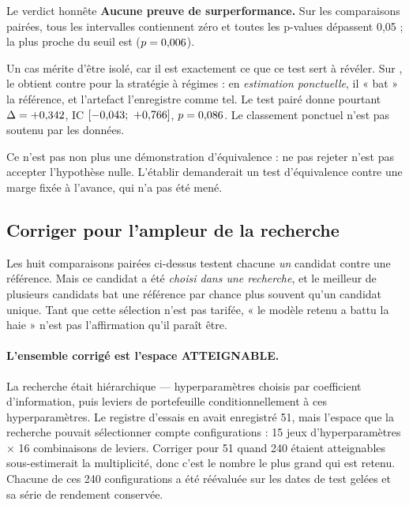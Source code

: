 \begin{resultatbox}{Le verdict honnête}
\textbf{Aucune preuve de surperformance.} Sur les \paireNb{} comparaisons pairées,
tous les intervalles contiennent zéro et toutes les p-values dépassent 0,05 ; la
plus proche du seuil est \paireMinPCas{} ($p = 0{,}006$).

Un cas mérite d'être isolé, car il est exactement ce que ce test sert à révéler.
Sur \paireCasUnivers{}, le \paireCasCandidat{} obtient
\paireCasSharpe{} contre \paireCasRefSharpe{} pour la stratégie à régimes : en
\emph{estimation ponctuelle}, il « bat » la référence, et l'artefact
l'enregistre comme tel. Le test pairé donne pourtant
$\Delta = +0{,}342$, IC $[-0{,}043;\ +0{,}766]$, $p = 0{,}086$. Le classement
ponctuel n'est pas soutenu par les données.

Ce n'est pas non plus une démonstration d'équivalence : ne pas rejeter n'est pas
accepter l'hypothèse nulle. L'établir demanderait un test d'équivalence contre une
marge fixée à l'avance, qui n'a pas été mené.
\end{resultatbox}

\subsection{Corriger pour l'ampleur de la recherche}



Les huit comparaisons pairées ci-dessus testent chacune \emph{un} candidat contre
une référence. Mais ce candidat a été \emph{choisi dans une recherche}, et le
meilleur de plusieurs candidats bat une référence par chance plus souvent qu'un
candidat unique. Tant que cette sélection n'est pas tarifée, « le modèle retenu
a battu la haie » n'est pas l'affirmation qu'il paraît être.

\paragraph{L'ensemble corrigé est l'espace ATTEIGNABLE.} La recherche était
hiérarchique — hyperparamètres choisis par coefficient d'information, puis
leviers de portefeuille conditionnellement à ces hyperparamètres. Le registre
d'essais en avait enregistré 51, mais l'espace que la recherche pouvait
sélectionner compte \correctionCandidats{} configurations : 15 jeux
d'hyperparamètres $\times$ 16 combinaisons de leviers. Corriger pour 51 quand
240 étaient atteignables sous-estimerait la multiplicité, donc c'est le nombre
le plus grand qui est retenu. Chacune de ces 240 configurations a été
réévaluée sur les dates de test gelées et sa série de rendement conservée.

